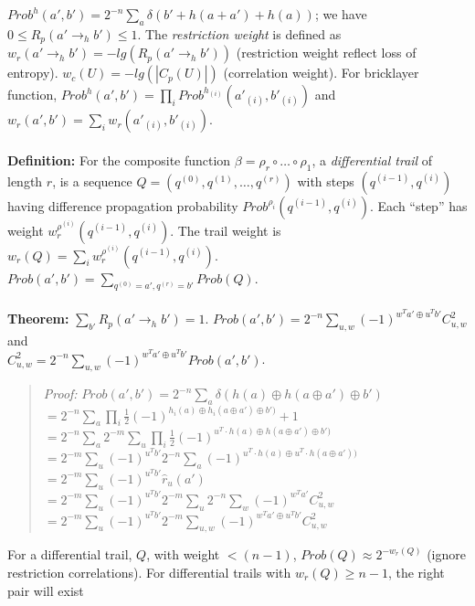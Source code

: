 $Prob^h(a',b')= 2^{-n} \sum_a \delta( b' + h(a+a')+h(a))$; we have 
$0 \le R_p(a' \rightarrow_h b') \le 1$.  
The
\emph{restriction weight} is defined as $w_r(a' \rightarrow_h b')= -lg(R_p(a' \rightarrow_h b'))$
(restriction weight reflect loss of entropy).  $w_c(U)= -lg(|C_p(U)|)$ (correlation weight).
For bricklayer function, $Prob^{h}(a', b')= \prod_i Prob^{h_{(i)}}(a'_{(i)}, b'_{(i)})$ and
$w_r (a', b')= \sum_i w_r(a'_{(i)},b'_{(i)})$.
\\
\\
{\bf Definition:} For the composite function
$\beta= \rho_r \circ \ldots \circ \rho_1$,
a \emph{differential trail} of length $r$, is a sequence
$Q= (q^{(0)}, q^{(1)}, \ldots, q^{(r)})$ with steps
$(q^{(i-1)}, q^{(i)})$ having difference propagation probability
$Prob^{\rho_i} (q^{(i-1)}, q^{(i)})$.
Each ``step'' has weight 
$w_r^{\rho^{(i)}} (q^{(i-1)}, q^{(i)})$.  The trail weight is
$w_r(Q)= \sum_i w_r^{\rho^{(i)}} (q^{(i-1)}, q^{(i)})$.  
$Prob(a',b')= \sum_{q^{(0)}=a', q^{(r)}=b'} Prob(Q)$.  
\\
\\
{\bf Theorem:}
$\sum_{b'} R_p(a' \rightarrow_h b') =1$.
$Prob(a', b')= 2^{-n} \sum_{u,w} (-1)^{w^Ta' \oplus u^T b'} C^2_{u,w}$ and \\
$C^2_{u,w}= 2^{-n} \sum_{u,w} (-1)^{w^Ta' \oplus u^Tb'} Prob(a', b')$.
\begin{quote}
\emph{Proof:}
$Prob(a', b')= 2^{-n} \sum_{a} \delta(h(a) \oplus h(a \oplus a') \oplus b')$\\
\jt 
$= 2^{-n} \sum_{a} \prod_i {\frac 1 2} (-1)^{h_i(a) \oplus h_i(a \oplus a') \oplus b')}+1$\\
\jt 
$= 2^{-n} \sum_{a} 
2^{-m} \sum_{u} 
\prod_i {\frac 1 2} (-1)^{u^T \cdot h(a) \oplus h(a \oplus a') \oplus b')}$\\
\jt 
$= 2^{-m} \sum_{u} (-1)^{u^Tb'}
2^{-n} \sum_{a} 
(-1)^{u^T \cdot h(a) \oplus u^T \cdot h(a \oplus a'))}$\\
\jt 
$= 2^{-m} \sum_{u} (-1)^{u^Tb'} \hat{r}_u(a')$\\
\jt 
$= 2^{-m} \sum_{u} (-1)^{u^Tb'}
2^{-m} \sum_{u} 
2^{-n} \sum_{w} (-1)^{w^Ta'} C^2_{u,w}$\\
\jt 
$= 2^{-m} \sum_{u} (-1)^{u^Tb'}
2^{-m} \sum_{u,w} 
(-1)^{w^Ta' \oplus u^Tb'} C^2_{u,w}$\\
\end{quote}
For a differential trail, $Q$,
with weight $<(n-1)$, $Prob(Q) \approx 2^{-w_r(Q)}$ (ignore restriction correlations).
For differential trails with $w_r(Q) \ge n-1$, the right pair will exist 
